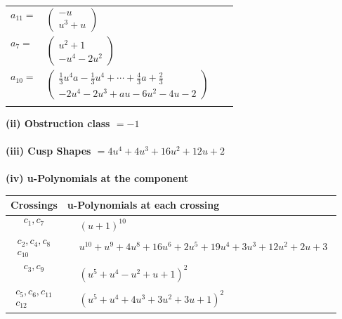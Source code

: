 \documentclass[1p]{elsarticle_modified}
\theoremstyle{definition}
\begin{document}
\begin{tabular}{m{7pt} m{180pt} m{7pt} m{180pt} }
\flushright $a_{11}=$&$\begin{pmatrix}- u\\u^3+u\end{pmatrix}$ \\
\flushright $a_{7}=$&$\begin{pmatrix}u^2+1\\- u^4-2 u^2\end{pmatrix}$ \\
\flushright $a_{10}=$&$\begin{pmatrix}\frac{1}{3} u^4 a-\frac{1}{3} u^4+\cdots+\frac{4}{3} a+\frac{2}{3}\\-2 u^4-2 u^3+a u-6 u^2-4 u-2\end{pmatrix}$\\&\end{tabular}
\flushleft \textbf{(ii) Obstruction class $= -1$}\\~\\
\flushleft \textbf{(iii) Cusp Shapes $= 4 u^4+4 u^3+16 u^2+12 u+2$}\\~\\
\newpage\renewcommand{\arraystretch}{1}
\flushleft \textbf{(iv) u-Polynomials at the component}\newline \\
\begin{tabular}{m{50pt}|m{274pt}}
Crossings & \hspace{64pt}u-Polynomials at each crossing \\
\hline $$\begin{aligned}c_{1},c_{7}\end{aligned}$$&$\begin{aligned}
&(u+1)^{10}
\end{aligned}$\\
\hline $$\begin{aligned}c_{2},c_{4},c_{8}\\c_{10}\end{aligned}$$&$\begin{aligned}
&u^{10}+u^9+4 u^8+16 u^6+2 u^5+19 u^4+3 u^3+12 u^2+2 u+3
\end{aligned}$\\
\hline $$\begin{aligned}c_{3},c_{9}\end{aligned}$$&$\begin{aligned}
&(u^5+u^4- u^2+u+1)^2
\end{aligned}$\\
\hline $$\begin{aligned}c_{5},c_{6},c_{11}\\c_{12}\end{aligned}$$&$\begin{aligned}
&(u^5+u^4+4 u^3+3 u^2+3 u+1)^2
\end{aligned}$\\
\hline
\end{tabular}\\~\\
\end{document}
